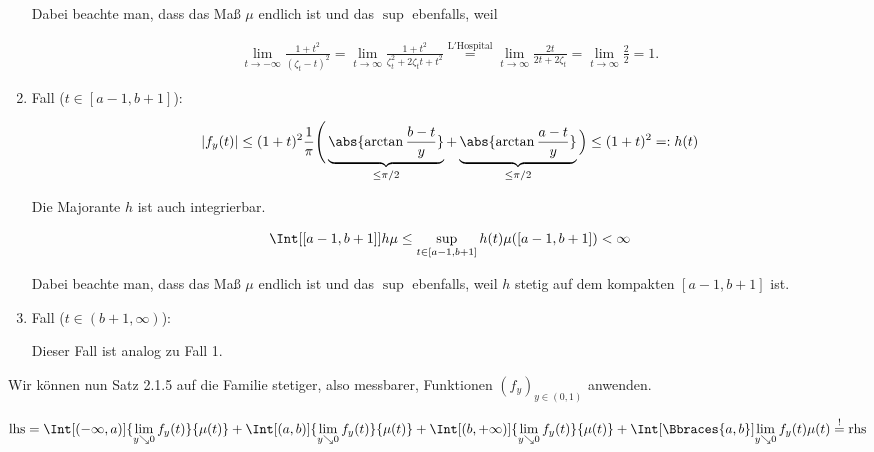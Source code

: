 \begin{solution}
\begin{enumerate}[label = \arabic*.]
    Dabei beachte man, dass das Maß $\mu$ endlich ist und das $\sup$ ebenfalls, weil

    \begin{align*}
        \lim_{t \to -\infty}
        \frac{1 + t^2}{(\zeta_t - t)^2}
        =
        \lim_{t \to \infty}
        \frac{1 + t^2}{\zeta_t^2 + 2 \zeta_t t + t^2}
        \stackrel
        {
            \mathrm{L'Hospital}
        }{=}
        \lim_{t \to \infty}
        \frac{2 t}{2 t + 2 \zeta_t}
        =
        \lim_{t \to \infty}
        \frac{2}{2}
        =
        1.
    \end{align*}

    \item Fall ($t \in [a-1, b+1]$):
    
    \begin{align*}
        |f_y(t)|
        \leq
        (1 + t)^2
        \frac{1}{\pi}
        \Bigg (
            \underbrace
            {
                \abs{\arctan \frac{b - t}{y}}
            }_{
                \leq \pi / 2
            }
            +
            \underbrace
            {
                \abs{\arctan \frac{a - t}{y}}
            }_{
                \leq \pi / 2
            }
        \Big )
        \leq
        (1 + t)^2
        =:
        h(t)
    \end{align*}

    Die Majorante $h$ ist auch integrierbar.

    \begin{align*}
        \Int[{[a-1, b+1]}]{h}{\mu}
        \leq
        \sup_{t \in [a-1, b+1]} h(t)
        \mu([a-1, b+1])
        <
        \infty
    \end{align*}

    Dabei beachte man, dass das Maß $\mu$ endlich ist und das $\sup$ ebenfalls, weil $h$ stetig auf dem kompakten $[a-1, b+1]$ ist.

    \item Fall ($t \in (b+1, \infty)$):
    
    Dieser Fall ist analog zu Fall 1.

\end{enumerate}


Wir können nun Satz 2.1.5 auf die Familie stetiger, also messbarer, Funktionen $(f_y)_{y \in (0, 1)}$ anwenden.

\begin{align*}
    \mathrm{lhs}
    =
    \Int[(-\infty, a)]
    {
        \lim_{y \searrow 0}
        f_y(t)
    }{\mu(t)}
    +
    \Int[(a, b)]
    {
        \lim_{y \searrow 0}
        f_y(t)
    }{\mu(t)}
    +
    \Int[(b, +\infty)]
    {
        \lim_{y \searrow 0}
        f_y(t)
    }{\mu(t)}
    +
    \Int[\Bbraces{a, b}]
    {
        \lim_{y \searrow 0}
        f_y(t)
    }{\mu(t)}
    \stackrel{!}{=}
    \mathrm{rhs}
\end{align*}


\end{solution}
